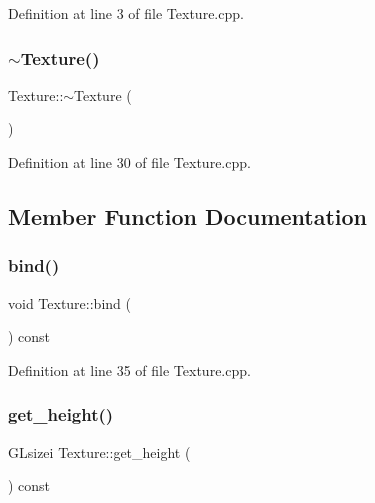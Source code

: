 Definition at line 3 of file Texture.\+cpp.

\mbox{\label{class_texture_a09c4bcb7462f64c1d20fa69dba3cee8a}} 
\subsubsection{\texorpdfstring{$\sim$\+Texture()}{~Texture()}}
{\footnotesize\ttfamily Texture\+::$\sim$\+Texture (\begin{DoxyParamCaption}{ }\end{DoxyParamCaption})}



Definition at line 30 of file Texture.\+cpp.



\subsection{Member Function Documentation}
\mbox{\label{class_texture_a4b85391c6e54686ec566ba38c62dde98}} 
\subsubsection{\texorpdfstring{bind()}{bind()}}
{\footnotesize\ttfamily void Texture\+::bind (\begin{DoxyParamCaption}{ }\end{DoxyParamCaption}) const}



Definition at line 35 of file Texture.\+cpp.

\mbox{\label{class_texture_afdc100805e42879c03439962c48f9dda}} 
\subsubsection{\texorpdfstring{get\+\_\+height()}{get\_height()}}
{\footnotesize\ttfamily G\+Lsizei Texture\+::get\+\_\+height (\begin{DoxyParamCaption}{ }\end{DoxyParamCaption}) const\hspace{0.3cm}{\ttfamily [inline]}}



